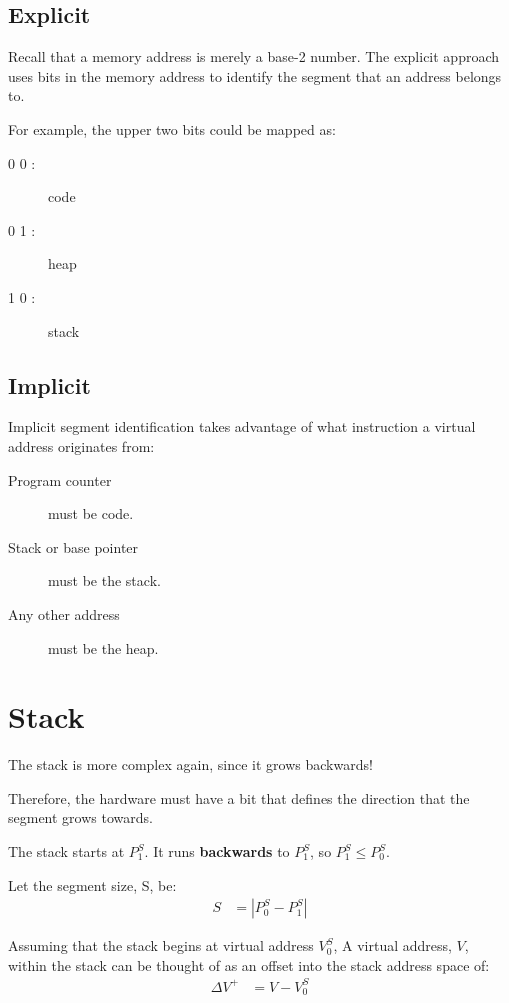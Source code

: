 \subsection{Explicit}

Recall that a memory address is merely a base-2 number.
The explicit approach uses bits in the memory address to identify the segment that an address belongs to.

For example, the upper two bits could be mapped as:
\begin{description}
\item[0 0 :] code
\item[0 1 :] heap
\item[1 0 :] stack
\end{description}

\subsection{Implicit}

Implicit segment identification takes advantage of what instruction a virtual address originates from:
\begin{description}
\item[Program counter] must be code.
\item[Stack or base pointer] must be the stack.
\item[Any other address] must be the heap.
\end{description}


\section{Stack}

The stack is more complex again, since it grows backwards!

Therefore, the hardware must have a bit that defines the direction that the segment grows towards.

The stack starts at $P^S_1$.
It runs \textbf{backwards} to $P^S_1$, so $P^S_1 \le P^S_0$.

Let the segment size, S, be:
\begin{align}
  S & = \left \lvert P^S_0 - P^S_1 \right \rvert \label{eq:segment-size}
\end{align}

Assuming that the stack begins at virtual address $V^S_0$, 
A virtual address, $V$, within the stack can be thought of as an offset into the stack address space of:
\begin{align}
  \Delta V^+ & = V - V^S_0 \label{eq:stack-offset}  
\end{align}

